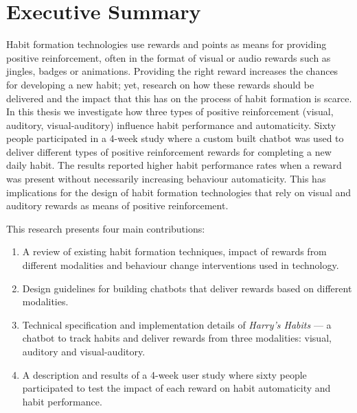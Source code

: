 
\section*{Executive Summary}
Habit formation technologies use rewards and points as means for
providing positive reinforcement, often in the format of visual
or audio rewards such as jingles, badges or animations.
Providing the right reward increases the chances for developing a new habit; yet, research on how these rewards should be delivered and the impact that this has on the process of habit formation is scarce.
In this thesis we investigate how three types of positive reinforcement (visual, auditory, visual-auditory) influence habit performance and automaticity.
Sixty people participated in a 4-week study where a custom built chatbot was used to deliver different types of positive reinforcement rewards for completing a new daily habit.
The results reported higher habit performance rates when a reward was present without necessarily increasing behaviour automaticity.
This has implications for the design of habit formation technologies that rely on visual and auditory rewards as means of positive reinforcement.

This research presents four main contributions:

\begin{enumerate}
  \item A review of existing habit formation techniques, impact of rewards from different modalities and behaviour change interventions used in technology.
  \item Design guidelines for building chatbots that deliver rewards based on different modalities.
  \item Technical specification and implementation details of \textit{Harry's Habits} --- a chatbot to track habits and deliver rewards from three modalities: visual, auditory and visual-auditory.
  \item A description and results of a 4-week user study where sixty people participated to test the impact of each reward on habit automaticity and habit performance.
\end{enumerate}

\newpage
